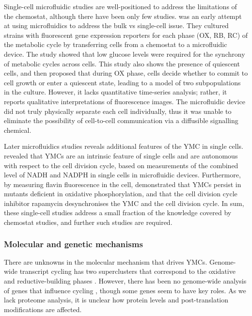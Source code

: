 Single-cell microfluidic studies are well-positioned to address the limitations of the chemostat,
although there have been only few studies.
\textcite{laxmanBehaviorMetabolicCycling2010} was an early attempt at using microfluidics to address the bulk vs single-cell issue.
They cultured strains with fluorescent gene expression reporters for each phase (OX, RB, RC) of the metabolic cycle by transferring cells from a chemostat to a microfluidic device.
The study showed that low glucose levels were required for the synchrony of metabolic cycles across cells.
This study also shows the presence of quiescent cells, and then proposed that during OX phase, cells decide whether to commit to cell growth or enter a quiescent state, leading to a model of two subpopulations in the culture.
However, it lacks quantitative time-series analysis; rather, it reports qualitative interpretations of fluorescence images.
The microfluidic device did not truly physically separate each cell individually, thus it was unable to eliminate the possibility of cell-to-cell communication via a diffusible signalling chemical.

Later microfluidics studies reveals additional features of the YMC in single cells.
\textcite{papagiannakisAutonomousMetabolicOscillations2017} revealed that YMCs are an intrinsic feature of single cells and are autonomous with respect to the cell division cycle, based on measurements of the combined level of NADH and NADPH in single cells in microfluidic devices.
Furthermore, by measuring flavin fluorescence in the cell, \textcite{baumgartnerFlavinbasedMetabolicCycles2018} demonstrated that YMCs persist in mutants deficient in oxidative phosphorylation, and that the cell division cycle inhibitor rapamycin desynchronises the YMC and the cell division cycle.
In sum, these single-cell studies address a small fraction of the knowledge covered by chemostat studies, and further such studies are required.


\subsubsection{Molecular and genetic mechanisms}
\label{subsubsec:intro-ymc-unresolved-molecular}

There are unknowns in the molecular mechanism that drives YMCs.
Genome-wide transcript cycling has two superclusters that correspond to the oxidative and reductive-building phases \parencite{machneYinYangYeast2012}.
However, there has been no genome-wide analysis of genes that influence cycling \parencite{mellorMolecularBasisMetabolic2016}, though some genes seem to have key roles.
As we lack proteome analysis, it is unclear how protein levels and post-translation modifications are affected.

